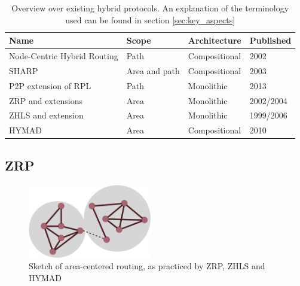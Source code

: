 \documentclass[a4paper,10pt]{scrartcl}
\begin{document}
\begin{table}[t]
    \begin{tabular}{p{}|l|l|l}
        Name & Scope & Architecture & Published \\
        \hline
        Node-Centric Hybrid Routing \cite{Roy_nodecentric} & Path & Compositional & 2002 \\ %
        SHARP\cite{SHARP} & Area and path & Compositional & 2003 \\ %
        P2P extension\cite{RFC-6997} of RPL\cite{RFC-6550} & Path & Monolithic & 2013\\
        ZRP \cite{ZRP-Draft} and extensions \cite{TZRP} \cite{IZR} \cite{WARP} & Area & Monolithic & 2002/2004\\
        ZHLS\cite{ZHLS} and extension \cite{ZHLS-GF} & Area & Monolithic & 1999/2006\\
        HYMAD\cite{HYMAD} & Area & Compositional & 2010\\ %
    \end{tabular}
    \caption{Overview over existing hybrid protocols. An explanation of the terminology used can be found in section \ref{sec:key_aspects}}
    \label{fig:overview}
\end{table}

\subsection{\gls{ZRP}}
\label{subsec:zrp}

\begin{figure}
  \begin{center}
    \includegraphics[width=0.48\textwidth]{../images/ZRP}
  \end{center}
  \caption{Sketch of area-centered routing, as practiced by ZRP, ZHLS and HYMAD}
  \label{fig:zrp_area_centered}
\end{figure}
\end{document}
